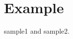 \documentclass{report}
\begin{document}
\chapter{Example}
\gls{sample1} and \gls{sample2}.

\printunsrtglossaries
\printindex
\end{document}
